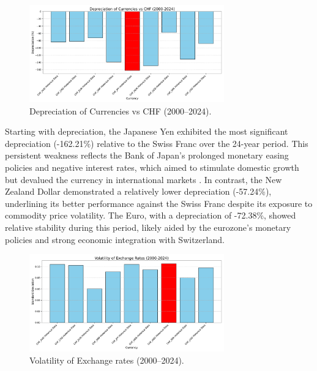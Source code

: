 \documentclass[11pt,a4paper,english,oneside]{book}
\begin{document}
\begin{figure}[h!]
    \centering
    \includegraphics[width=0.75\textwidth]{images/depreciation_2000_2024.pdf}
    \caption{Depreciation of Currencies vs CHF (2000--2024).}
    \label{fig:depreciation_2000_2024}
\end{figure}

Starting with depreciation, the Japanese Yen exhibited the most significant depreciation (-162.21\%) relative to the Swiss Franc over the 24-year period. This persistent weakness reflects the Bank of Japan's prolonged monetary easing policies and negative interest rates, which aimed to stimulate domestic growth but devalued the currency in international markets \parencite{shirai2020bank}. In contrast, the New Zealand Dollar demonstrated a relatively lower depreciation (-57.24\%), underlining its better performance against the Swiss Franc despite its exposure to commodity price volatility. The Euro, with a depreciation of -72.38\%, showed relative stability during this period, likely aided by the eurozone's monetary policies and strong economic integration with Switzerland.

\begin{figure}[h!]
    \centering
    \includegraphics[width=0.75\textwidth]{images/volatility_2000_2024.pdf}
    \caption{Volatility of Exchange rates (2000--2024).}
    \label{fig:volatility_2000_2024}
\end{figure}
\end{document}
